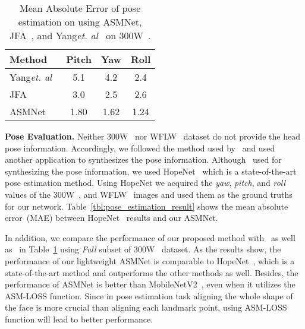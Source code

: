 \documentclass[final]{cvpr}
\begin{document}
\begin{table}[t]
\caption{Mean Absolute Error of pose estimation on using ASMNet, JFA~\cite{xu2017joint}, and Yang\textit{et. al}~\cite{yang2015face} on 300W~\cite{sagonas2013300}.}
\label{tbl:pose_estimation_result_external}
\centering
\small

\begin{tabular}{l c c c }
\hline
Method & Pitch & Yaw  & Roll \\
\hline

Yang\textit{et. al}~\cite{yang2015face}   & 5.1   & 4.2  & 2.4  \\
JFA~\cite{xu2017joint}                  & 3.0   & 2.5  & 2.6  \\ \hline
ASMNet                                  & 1.80  & 1.62 & 1.24 \\ \hline
\end{tabular}
\end{table}


\textbf{Pose Evaluation.}
Neither 300W~\cite{sagonas2013300} nor WFLW~\cite{wu2018look} dataset do not provide the head pose information. Accordingly, we followed the method used by~\cite{xu2017joint} and used another application to synthesizes the pose information. Although~\cite{xu2017joint} used \cite{asthana2013robust} for synthesizing the pose information, we used HopeNet~\cite{Ruiz_2018_CVPR_Workshops} which is a state-of-the-art pose estimation method. Using HopeNet we acquired the \textit{yaw}, \textit{pitch}, and \textit{roll} values of the 300W~\cite{sagonas2013300}, and WFLW~\cite{wu2018look} images and used them as the ground truths for our network. Table~\ref{tbl:pose_estimation_result} shows the mean absolute error~(MAE) between HopeNet~\cite{Ruiz_2018_CVPR_Workshops} results and our ASMNet. 

In addition, we compare the performance of our proposed method with~\cite{xu2017joint} as well as~\cite{yang2015face} in Table~\ref{tbl:pose_estimation_result_external} using \textit{Full} subset of 300W~\cite{sagonas2013300} dataset. As the results show, the performance of our lightweight ASMNet is comparable to HopeNet~\cite{Ruiz_2018_CVPR_Workshops}, which is a state-of-the-art method and outperforms the other methods as well. Besides, the performance of ASMNet is better than MobileNetV2~\cite{sandler2018mobilenetv2}, even when it utilizes the ASM-LOSS function. Since in pose estimation task aligning the whole shape of the face is more crucial than aligning each landmark point, using ASM-LOSS function will lead to better performance. 
\end{document}
